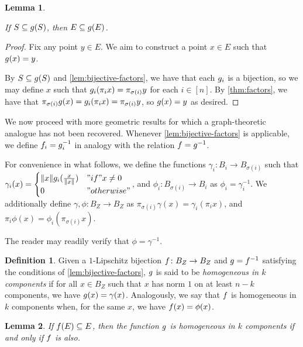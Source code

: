 \documentclass{amsart}
\newtheorem{lemma}{Lemma}[section]
\theoremstyle{definition}
\newtheorem{definition}{Definition}[section]
\begin{document}
\begin{lemma} \label{lem:sphere-implies-extreme}

  If $S \subseteq g(S)$, then $E \subseteq g(E)$.
\end{lemma}

\begin{proof} 

  Fix any point $y \in E$. We aim to construct a point $x \in E$ such that $g(x)=y$.

  By $S \subseteq g(S)$ and \autoref{lem:bijective-factors}, we have that each $g_i$ is a bijection, so we may define $x$ such that $g_i (\pi_i x) = \pi_{\sigma(i)} y$ for each $i \in [n]$. By  \autoref{thm:factors}, we have that $\pi_{\sigma(i)} g(x) = g_i (\pi_i x) = \pi_{\sigma(i)} y$, so $g(x) = y$ as desired.
\end{proof}

We now proceed with more geometric results for which a graph-theoretic analogue has not been recovered. Whenever \autoref{lem:bijective-factors} is applicable, we define $f_i = g_i^{-1}$ in analogy with the relation $f = g^{-1}$.

For convenience in what follows, we define the functions $\gamma_i  \colon B_i \to B_{\sigma(i)}$ such that
$\gamma_i (x) =
\begin{cases}\norm{x} g_i (\frac{x}{\norm{x}}) &"if" x \neq 0\\ 0 &"otherwise"\end{cases}$, and $\phi_i \colon B_{\sigma(i)} \to B_i$ as $\phi_i = \gamma_i^{-1}$. We additionally define
$\gamma, \phi \colon B_Z \to B_Z$ as $\pi_{\sigma(i)} \gamma(x) = \gamma_i (\pi_i x)$, and
$\pi_i \phi(x) = \phi_i (\pi_{\sigma(i)} x)$.

The reader may readily verify that $\phi = \gamma^{-1}$.

\begin{definition} 

  Given a $1$-Lipschitz bijection $f \colon B_Z \to B_Z$ and $g = f^{-1}$ satisfying the conditions of \autoref{lem:bijective-factors}, $g$ is said to be \textit{homogeneous in $k$ components} if for all $x \in B_Z$ such that $x$ has norm $1$ on at least $n-k$ components, we have $g(x) = \gamma(x)$. Analogously, we say that $f$ is homogeneous in $k$ components when, for the same $x$, we have $f(x) = \phi(x)$.
\end{definition}

\begin{lemma} \label{lem:homogeneity-equiv}
\annotation
  If $f(E) \subseteq E$, then
  the function $g$ is homogeneous in $k$ components if and only if
  $f$ is also.
\end{lemma}
\end{document}
